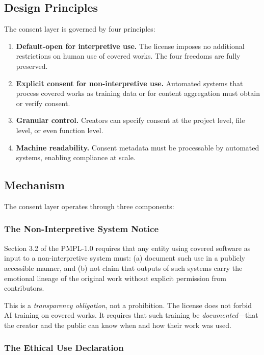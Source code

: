 \documentclass[11pt,twocolumn]{article}
\begin{document}
\subsection{Design Principles}

The consent layer is governed by four principles:

\begin{enumerate}
    \item \textbf{Default-open for interpretive use.} The license imposes
          no additional restrictions on human use of covered works. The
          four freedoms are fully preserved.
    \item \textbf{Explicit consent for non-interpretive use.} Automated
          systems that process covered works as training data or for
          content aggregation must obtain or verify consent.
    \item \textbf{Granular control.} Creators can specify consent at
          the project level, file level, or even function level.
    \item \textbf{Machine readability.} Consent metadata must be
          processable by automated systems, enabling compliance at scale.
\end{enumerate}

\subsection{Mechanism}

The consent layer operates through three components:

\subsubsection{The Non-Interpretive System Notice}

Section 3.2 of the PMPL-1.0 requires that any entity using covered
software as input to a non-interpretive system must: (a) document such
use in a publicly accessible manner, and (b) not claim that outputs of
such systems carry the emotional lineage of the original work without
explicit permission from contributors.

This is a \emph{transparency obligation}, not a prohibition. The
license does not forbid AI training on covered works. It requires that
such training be \emph{documented}---that the creator and the public
can know when and how their work was used.

\subsubsection{The Ethical Use Declaration}
\end{document}
